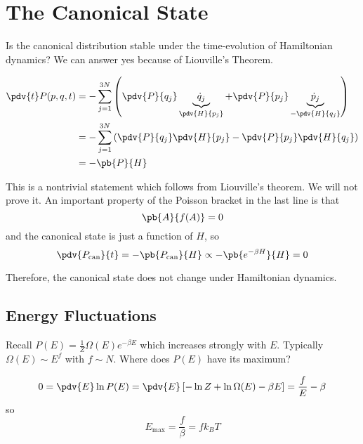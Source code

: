 \documentclass[a4paper,twoside,master.tex]{subfiles}
\begin{document}

\section{The Canonical State}
\label{sec:the_canonical_state}

Is the canonical distribution stable under the time-evolution of Hamiltonian dynamics? We can answer yes because of Liouville's Theorem.

\begin{align}
    \pdv{t}P(p,q,t) &= - \sum_{j=1}^{3N} \left( \pdv{P}{q_j}\underbrace{\dot{q}_j}_{\pdv{H}{p_j}} + \pdv{P}{p_j}\underbrace{\dot{p}_j}_{- \pdv{H}{q_j}} \right) \\
    &= - \sum_{j=1}^{3N} \left( \pdv{P}{q_j} \pdv{H}{p_j} - \pdv{P}{p_j} \pdv{H}{q_j} \right) \\
    &= - \pb{P}{H}
\end{align}

This is a nontrivial statement which follows from Liouville's theorem. We will not prove it. An important property of the Poisson bracket in the last line is that
\begin{equation}
    \pb{A}{f(A)} = 0
\end{equation}
and the canonical state is just a function of $ H $, so
\begin{equation}
    \pdv{P_{\text{can}}}{t} = - \pb{P_{\text{can}}}{H} \propto - \pb{e^{- \beta H}}{H} = 0
\end{equation}

Therefore, the canonical state does not change under Hamiltonian dynamics.

\subsection{Energy Fluctuations}
\label{sub:energy_fluctuations}

Recall $ P(E) = \frac{1}{Z} \Omega(E) e^{- \beta E} $ which increases strongly with $ E $. Typically $ \Omega(E) \sim E^f $ with $ f \sim N $. Where does $ P(E) $ have its maximum?

\begin{equation}
    0 = \pdv{E}\ln P(E) = \pdv{E}\left[ - \ln Z + \ln \Omega(E) - \beta E \right] = \frac{f}{E} - \beta
\end{equation}
so
\begin{equation}
    E_{\text{max}} = \frac{f}{\beta} = f k_B T
\end{equation}
\end{document}
